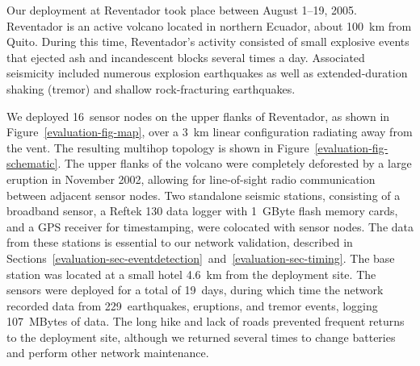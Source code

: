 
Our deployment at Reventador took place between August 1--19, 2005.
Reventador is an active volcano located in northern Ecuador, about 100~km
from Quito. 
During this time, Reventador's activity consisted of small explosive events
that ejected ash and incandescent blocks several times a day. Associated
seismicity included numerous explosion earthquakes as well as
extended-duration shaking (tremor) and shallow rock-fracturing earthquakes.

We deployed 16~sensor nodes on the upper flanks of Reventador, as shown in
Figure~\ref{evaluation-fig-map}, over a 3~km linear configuration radiating
away from the vent. The resulting multihop topology is shown in
Figure~\ref{evaluation-fig-schematic}. The upper flanks of the volcano were
completely deforested by a large eruption in November 2002, allowing for
line-of-sight radio communication between adjacent sensor nodes.  Two
standalone seismic stations, consisting of a broadband sensor, a Reftek 130
data logger with 1~GByte flash memory cards, and a GPS receiver for
timestamping, were colocated with sensor nodes. The data from these stations
is essential to our network validation, described in
Sections~\ref{evaluation-sec-eventdetection}~and~\ref{evaluation-sec-timing}.
The base station was located at a small hotel 4.6~km from the deployment
site.  The sensors were deployed for a total of 19~days, during which time
the network recorded data from 229~earthquakes, eruptions, and tremor events,
logging 107~MBytes of data. The long hike and lack of roads prevented
frequent returns to the deployment site, although we returned several times
to change batteries and perform other network maintenance.




